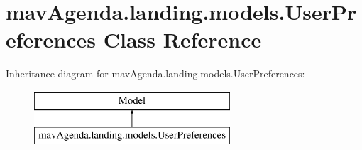 \hypertarget{classmavAgenda_1_1landing_1_1models_1_1UserPreferences}{}\section{mav\+Agenda.\+landing.\+models.\+User\+Preferences Class Reference}
\label{classmavAgenda_1_1landing_1_1models_1_1UserPreferences}
Inheritance diagram for mav\+Agenda.\+landing.\+models.\+User\+Preferences\+:\begin{figure}[H]
\begin{center}
\leavevmode
\includegraphics[height=2.000000cm]{classmavAgenda_1_1landing_1_1models_1_1UserPreferences}
\end{center}
\end{figure}
